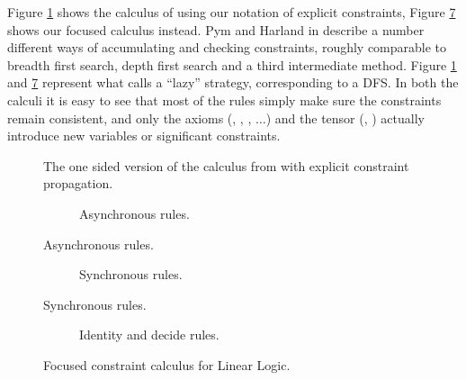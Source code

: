 Figure \ref{fig:hp calculus} shows the calculus of \cite{HarlandPym} using our notation of explicit constraints, Figure \ref{fig:calculus} shows our focused calculus instead.
Pym and Harland in \cite{HarlandPym} describe a number different ways of accumulating and checking constraints, roughly comparable to breadth first search, depth first search and a third intermediate method.
Figure \ref{fig:hp calculus} and \ref{fig:calculus} represent what \cite{HarlandPym} calls a ``lazy'' strategy, corresponding to a DFS.
In both the calculi it is easy to see that most of the rules simply make sure the constraints remain consistent, and only the axioms (\derRule{\displayid[1]}, \derRule{\displayid[2]}, , $\dots$) and the tensor (\derRule{\displayten}, \derRule[PH]{\displayten}) actually introduce new variables or significant constraints.
\begin{figure}[p]
	\centering
	
	\caption{The one sided version of the calculus from \cite{HarlandPym} with explicit constraint propagation.\label{fig:hp calculus}}
\end{figure}
\begin{figure}[p]
	\begin{subfigure}{\textwidth}
		\centering
		
		\caption{Asynchronous rules.\label{fig:asy calculus}}
	\end{subfigure}
\end{figure}
\begin{figure}[p]
	\ContinuedFloat
	\begin{subfigure}{\textwidth}
		\centering
		
		\caption{Synchronous rules.\label{fig:sync calculus}}
	\end{subfigure}
\end{figure}
\begin{figure}[ht]
	\ContinuedFloat
	\begin{subfigure}{\textwidth}
		\centering
		
		\caption{Identity and decide rules.\label{fig:id dec calculus}}
	\end{subfigure}
	\caption{Focused constraint calculus for Linear Logic. \label{fig:calculus}}
\end{figure}
